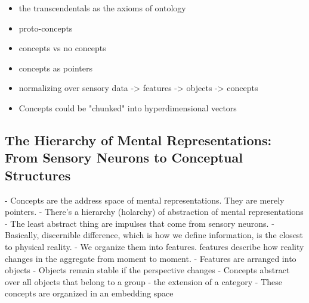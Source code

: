 \begin{itemize}
    \item the transcendentals as the axioms of ontology
    \item proto-concepts
    \item concepts vs no concepts
    \item concepts as pointers
    \item normalizing over sensory data -> features -> objects -> concepts 
    \item Concepts could be "chunked" into hyperdimensional vectors
\end{itemize}

\subsection{The Hierarchy of Mental Representations: From Sensory Neurons to Conceptual Structures}

- Concepts are the address space of mental representations. They are merely pointers. 
- There's a hierarchy (holarchy) of abstraction of mental representations
- The least abstract thing are impulses that come from sensory neurons. 
- Basically, discernible difference, which is how we define information, is the closest to physical reality.
- We organize them into features. features describe how reality changes in the aggregate from moment to moment.
- Features are arranged into objects
- Objects remain stable if the perspective changes
- Concepts abstract over all objects that belong to a group - the extension of a category
- These concepts are organized in an embedding space  





